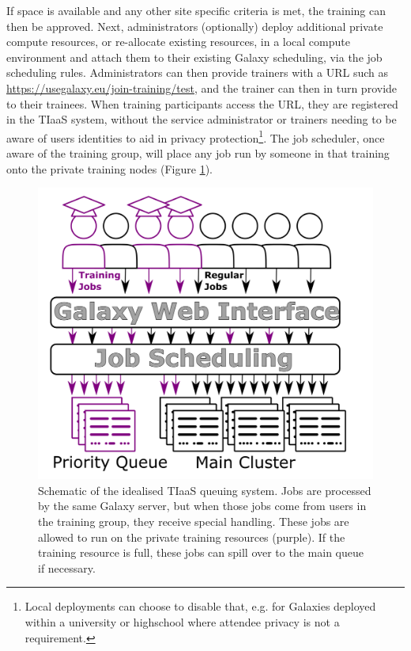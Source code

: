 \documentclass[a4paper,num-refs]{oup-contemporary}
\begin{document}
If space is available and any other site specific criteria is met, the training can then be approved. Next, administrators (optionally) deploy additional private compute resources, or re-allocate existing resources, in a local compute environment and attach them to their existing Galaxy scheduling, via the job scheduling rules. Administrators can then provide trainers with a URL such as \url{https://usegalaxy.eu/join-training/test}, and the trainer can then in turn provide to their trainees. When training participants access the URL, they are registered in the TIaaS system, without the service administrator or trainers needing to be aware of users identities to aid in privacy protection\footnote{Local deployments can choose to disable that, e.g. for Galaxies deployed within a university or highschool where attendee privacy is not a requirement.}. The job scheduler, once aware of the training group, will place any job run by someone in that training onto the private training nodes (Figure \ref{figure:queue}).

\begin{figure}[bt!]
\centering
\includegraphics[width=\linewidth]{images/rules.png}
\caption{Schematic of the idealised TIaaS queuing system. Jobs are processed by the same Galaxy server, but when those jobs come from users in the training group, they receive special handling. These jobs are allowed to run on the private training resources (purple). If the training resource is full, these jobs can spill over to the main queue if necessary.}\label{figure:queue}
\end{figure}
\end{document}
